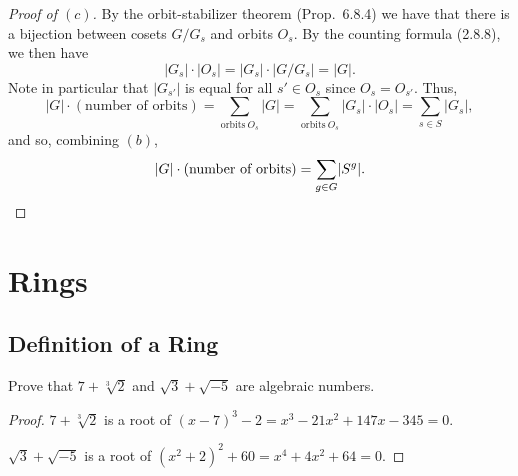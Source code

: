 \documentclass[12pt]{article}
\theoremstyle{remark}
\begin{document}
\begin{proof}[Proof of $(c)$]
  By the orbit-stabilizer theorem (Prop.~6.8.4) we have that there is a bijection between cosets $G/G_s$ and orbits $O_s$. By the counting formula (2.8.8), we then have
  \begin{equation*}
    \lvert G_s \rvert\cdot\lvert O_s \rvert = \lvert G_s \rvert\cdot\lvert G/G_s \rvert = \lvert G \rvert.
  \end{equation*}
  Note in particular that $\lvert G_{s'} \rvert$ is equal for all $s' \in O_s$ since $O_s = O_{s'}$. Thus,
  \begin{equation*}
    \lvert G \rvert \cdot (\text{number of orbits}) = \sum_{\text{orbits}~O_s} \lvert G \rvert = \sum_{\text{orbits}~O_s} \lvert G_s \rvert\cdot\lvert O_s \rvert = \sum_{s \in S} \lvert G_s \rvert,
  \end{equation*}
  and so, combining $(b)$,
  \begin{equation*}
    \lvert G \rvert \cdot (\text{number of orbits}) = \sum_{g \in G} \lvert S^g \rvert.\qedhere
  \end{equation*}
\end{proof}
\endgroup

\setcounter{section}{10}
\section{Rings}
\subsection{Definition of a Ring}
\begin{problem}
  Prove that $7 + \sqrt[3]{2}$ and $\sqrt{3} + \sqrt{-5}$ are algebraic numbers.
\end{problem}
\begin{proof}
  $7 + \sqrt[3]{2}$ is a root of $(x - 7)^3 - 2 = x^3 - 21x^2 + 147x - 345 = 0$.
  \par $\sqrt{3} + \sqrt{-5}$ is a root of $(x^2 + 2)^2 + 60 = x^4 + 4x^2 + 64 = 0$.
\end{proof}
\end{document}
